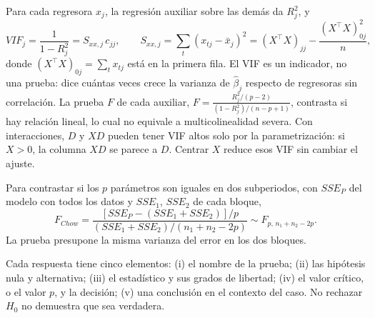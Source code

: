 \documentclass[11pt,letterpaper]{article}
\begin{document}
 Para cada regresora $x_j$, la regresión auxiliar sobre las demás da $R_j^2$, y
\[
VIF_j=\frac1{1-R_j^2}=S_{xx,j}\,c_{jj},\qquad S_{xx,j}=\sum_t(x_{tj}-\bar x_j)^2=(X^\top X)_{jj}-\frac{(X^\top X)_{0j}^2}{n},
\]
donde $(X^\top X)_{0j}=\sum_tx_{tj}$ está en la primera fila. El VIF es un indicador, no una prueba: dice cuántas veces crece la varianza de $\hat\beta_j$ respecto de regresoras sin correlación. La prueba $F$ de cada auxiliar, $F=\frac{R_j^2/(p-2)}{(1-R_j^2)/(n-p+1)}$, contrasta si hay relación lineal, lo cual no equivale a multicolinealidad severa. Con interacciones, $D$ y $XD$ pueden tener VIF altos solo por la parametrización: si $X>0$, la columna $XD$ se parece a $D$. Centrar $X$ reduce esos VIF sin cambiar el ajuste.

 Para contrastar si los $p$ parámetros son iguales en dos subperiodos, con $SSE_P$ del modelo con todos los datos y $SSE_1$, $SSE_2$ de cada bloque,
\[
F_{Chow}=\frac{[SSE_P-(SSE_1+SSE_2)]/p}{(SSE_1+SSE_2)/(n_1+n_2-2p)}\sim F_{p,\,n_1+n_2-2p}.
\]
La prueba presupone la misma varianza del error en los dos bloques.

 Cada respuesta tiene cinco elementos: (i) el nombre de la prueba; (ii) las hipótesis nula y alternativa; (iii) el estadístico y sus grados de libertad; (iv) el valor crítico, o el valor $p$, y la decisión; (v) una conclusión en el contexto del caso. No rechazar $H_0$ no demuestra que sea verdadera.


\end{document}
